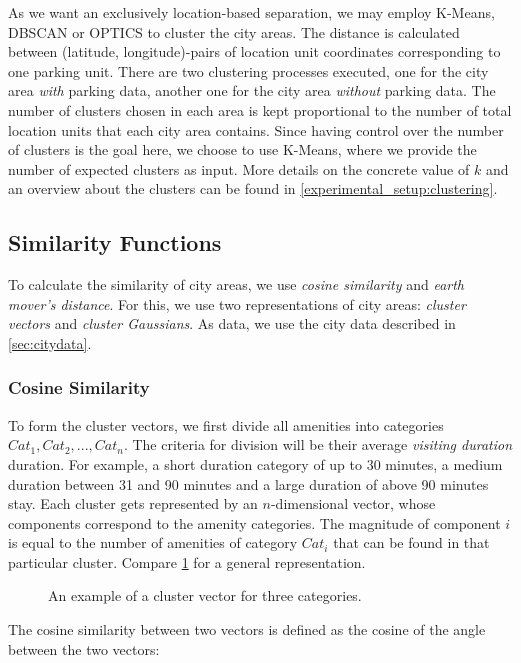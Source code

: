 As we want an exclusively location-based separation, we may employ K-Means, DBSCAN or OPTICS to cluster the city areas. The distance is calculated between (latitude, longitude)-pairs of location unit coordinates corresponding to one parking unit. There are two clustering processes executed, one for the city area \textit{with} parking data, another one for the city area \textit{without} parking data. The number of clusters chosen in each area is kept proportional to the number of total location units that each city area contains. Since having control over the number of clusters is the goal here, we choose to use K-Means, where we provide the number of expected clusters as input. More details on the concrete value of $k$ and an overview about the clusters can be found in \cref{experimental_setup:clustering}.

\subsection{Similarity Functions}
\label{realization:similarity_functions}
To calculate the similarity of city areas, we use \textit{cosine similarity} and \textit{earth mover's distance}. For this, we use two representations of city areas: \textit{cluster vectors} and \textit{cluster Gaussians}. As data, we use the city data described in \cref{sec:citydata}.

\subsubsection{Cosine Similarity}
\label{realization:vectors}
To form the cluster vectors, we first divide all amenities into categories $Cat_1, Cat_2, ..., Cat_n$.
The criteria for division will be their average \textit{visiting duration} duration.
For example, a short duration category of up to 30 minutes, a medium duration between 31 and 90 minutes and a large duration of above 90 minutes stay.
Each cluster gets represented by an $n$-dimensional vector, whose components correspond to the amenity categories.
The magnitude of component $i$ is equal to the number of amenities of category $Cat_i$ that can be found in that particular cluster.
Compare \cref{fig:cluster_vector} for a general representation.

\begin{figure}[!ht]
	\centering
	
	\caption{An example of a cluster vector for three categories.}
	\label{fig:cluster_vector}
\end{figure}
The cosine similarity between two vectors is defined as the cosine of the angle between the two vectors:

